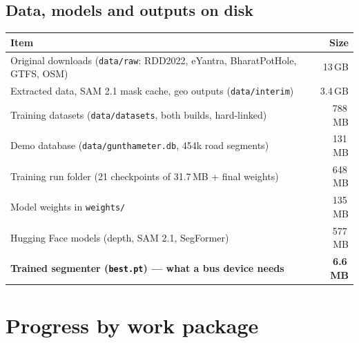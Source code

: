 \documentclass[11pt,a4paper]{article}
\newcommand{\code}[1]{\texttt{\small #1}}
\begin{document}
\subsection{Data, models and outputs on disk}
\begin{center}
\small
\begin{tabular}{@{}l r@{}}
\toprule
\textbf{Item} & \textbf{Size}\\
\midrule
Original downloads (\code{data/raw}: RDD2022, eYantra, BharatPotHole, GTFS, OSM) & 13\,GB\\
Extracted data, SAM 2.1 mask cache, geo outputs (\code{data/interim}) & 3.4\,GB\\
Training datasets (\code{data/datasets}, both builds, hard-linked) & 788\,MB\\
Demo database (\code{data/gunthameter.db}, 454k road segments) & 131\,MB\\
Training run folder (21 checkpoints of 31.7\,MB + final weights) & 648\,MB\\
Model weights in \code{weights/} & 135\,MB\\
Hugging Face models (depth, SAM 2.1, SegFormer) & 577\,MB\\
\midrule
\textbf{Trained segmenter (\code{best.pt}) --- what a bus device needs} & \textbf{6.6\,MB}\\
\bottomrule
\end{tabular}
\end{center}

\section{Progress by work package}\label{sec:status}
\end{document}
